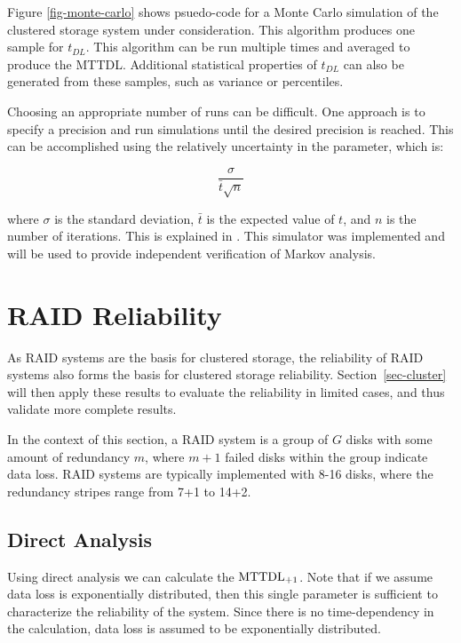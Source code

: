 \documentclass[11pt]{article}
\numberwithin{equation}{section}
\begin{document}
Figure \ref{fig-monte-carlo} shows psuedo-code for a Monte Carlo simulation of
the clustered storage system under consideration.  This algorithm produces one
sample for $t_{DL}$.  This algorithm can be run multiple times and averaged to
produce the MTTDL.  Additional statistical properties of $t_{DL}$ can also be
generated from these samples, such as variance or percentiles. 

Choosing an appropriate number of runs can be difficult.  One approach is to
specify a precision and run simulations until the desired precision is
reached.  This can be accomplished using the relatively uncertainty in the
parameter, which is:

$$\frac{\sigma}{\bar{t}\sqrt{n}}$$

where $\sigma$ is the standard deviation, $\bar{t}$ is the expected value of
$t$, and $n$ is the number of iterations.  This is explained in \cite{eval}.
This simulator was implemented and will be used to provide independent
verification of Markov analysis.

\section{RAID Reliability}
\label{sec-raid}

As RAID systems are the basis for clustered storage, the reliability of RAID
systems also forms the basis for clustered storage reliability.
Section~\ref{sec-cluster} will then apply these results to evaluate the
reliability in limited cases, and thus validate more complete results.

In the context of this section, a RAID system is a group of $G$ disks with
some amount of redundancy $m$, where $m+1$ failed disks within the group
indicate data loss.  RAID systems are typically implemented with 8-16 disks,
where the redundancy stripes range from 7+1 to 14+2.

\subsection{Direct Analysis}

Using direct analysis we can calculate the ${\rm MTTDL_{+1}}$.  Note that if
we assume data loss is exponentially distributed, then this single parameter
is sufficient to characterize the reliability of the system.  Since there is
no time-dependency in the calculation, data loss is assumed to be
exponentially distributed.
\end{document}
